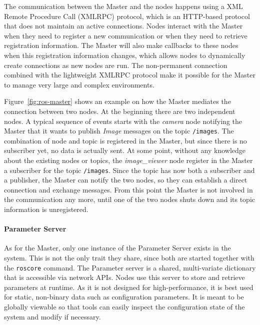 The communication between the Master and the nodes happens using a XML Remote Procedure Call (XMLRPC) protocol, which is an HTTP-based protocol that does not maintain an active connections. Nodes interact with the Master when they need to register a new communication or when they need to retrieve registration information. The Master will also make callbacks to these nodes when this registration information changes, which allows nodes to dynamically create connections as new nodes are run. The non-permanent connection combined with the lightweight XMLRPC protocol make it possible for the Master to manage  very large and complex environments.

Figure~\ref{fig:ros-master} shows an example on how the Master mediates the connection between two nodes. At the beginning there are two independent nodes. A typical sequence of events starts with the \textit{camera} node notifying the Master that it wants to publish \textit{Image} messages on the topic \texttt{/images}. The combination of node and topic is registered in the Master, but since there is no subscriber yet, no data is actually sent. At some point, without any knowledge about the existing nodes or topics, the \textit{image\_viewer} node register in the Master a subscriber for the topic \texttt{/images}. Since the topic has now both a subscriber and a publisher, the Master can notify the two nodes, so they can establish a direct connection and exchange messages. From this point the Master is not involved in the communication any more, until one of the two nodes shuts down and its topic information is unregistered.

\paragraph{Parameter Server}  As for the Master, only one instance of the Parameter Server exists in the system. This is not the only trait they share, since both are started together with the \texttt{roscore} command. The Parameter server is a shared, multi-variate dictionary that is accessible via network APIs. Nodes use this server to store and retrieve parameters at runtime. As it is not designed for high-performance, it is best used for static, non-binary data such as configuration parameters. It is meant to be globally viewable so that tools can easily inspect the configuration state of the system and modify if necessary.

